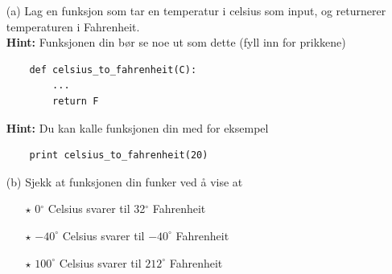 \documentclass[a4paper, 11pt, notitlepage]{article}
\begin{document}
\begin{itemize}
	\item[(a)] Lag en funksjon som tar en temperatur i celsius som input, og returnerer temperaturen i Fahrenheit. \\
	\textbf{Hint:} Funksjonen din bør se noe ut som dette (fyll inn for prikkene)
	\begin{lstlisting}
	def celsius_to_fahrenheit(C):
		...
		return F
	\end{lstlisting}
	\textbf{Hint:} Du kan kalle funksjonen din med for eksempel
	\begin{lstlisting}
	print celsius_to_fahrenheit(20)
	\end{lstlisting}
	\item[(b)] Sjekk at funksjonen din funker ved å vise at 
	\begin{itemize}
		\item[$\star$] 0$^\circ$ Celsius svarer til 32$^\circ$ Fahrenheit
		\item[$\star$] $-40^\circ$ Celsius svarer til $-40^\circ$ Fahrenheit
		\item[$\star$] $100^\circ$ Celsius svarer til $212^\circ$ Fahrenheit
	\end{itemize}
\end{itemize}



\end{document}
